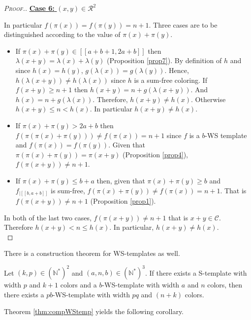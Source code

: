 \begin{proof}[\textsc{Proof.}]
\noindent \underline{\textbf{Case 6:} \((x,y) \in \mathcal{R}^2\)}
\par
In particular \(f(\pi(x)) = f(\pi(y))=n + 1\). Three cases are to be distinguished according to the value of \(\pi(x) + \pi(y)\).
\begin{itemize}
\item If \(\pi(x) + \pi(y) \in [\![a + b + 1, 2 a + b]\!]\) then \(\lambda(x + y) = \lambda(x) + \lambda(y)\)
	(Proposition \ref{prop7}). By definition of \(h\) and since \(h(x) = h(y)\), \(g(\lambda(x)) = g(\lambda(y))\).
	Hence, \(h(\lambda(x + y)) \neq h(\lambda(x))\) since \(h\) is a sum-free coloring. If \(f(x+y) \geqslant n + 1\)
	then \(h(x + y) = n + g(\lambda(x + y))\). And \(h(x) = n + g(\lambda(x))\). Therefore, \(h(x + y)  \neq h(x)\).
	Otherwise \(h(x+y) \leqslant n < h(x)\). In particular \(h(x + y) \neq h(x)\).
\item If \(\pi(x)+\pi(y)>2a+b\) then \(f(\pi(\pi(x)+\pi(y))) \neq f(\pi(x)) = n + 1\) since \(f\) is a \(b\)-WS template and
	\(f(\pi(x)) = f(\pi(y))\). Given that \(\pi(\pi(x)+\pi(y)) = \pi(x+y)\) (Proposition \ref{prop4}), \(f(\pi(x+y)) \neq n + 1\).
\item \begin{sloppypar}
	If \(\pi(x)+\pi(y)\leqslant b+a\) then, given that \(\pi(x)+\pi(y) \geqslant b\) and \(f_{| [\![b, a + b ]\!]}\) is
	sum-free, \({f(\pi(x) + \pi(y)) \neq f(\pi(x)) = n + 1}\). That is \({f(\pi(x + y)) \neq n + 1}\) (Proposition \ref{prop1}).
	\end{sloppypar}
\end{itemize}
\par
In both of the last two cases, \({f(\pi(x + y)) \neq n + 1}\) that is \(x+y \in \mathcal{C}\). Therefore \(h(x+y) < n \leqslant h(x)\).
In particular, \(h(x + y) \neq h(x)\). \\
\end{proof}

There is a construction theorem for WS-templates as well.

\begin{theorem}
\label{thm:compWStemp}
Let \((k,p) \in (\mathbb{N}^*)^2\) and \((a, n, b) \in (\mathbb{N}^*)^3\). If there exists a S-template with width
\(p\) and \(k+1\) colors and a \(b\)-WS-template with width \(a\) and \(n\) colors, then there exists a \(pb\)-WS-template
with width \(pq\) and \((n+k)\) colors.
\end{theorem}

Theorem \ref{thm:compWStemp} yields the following corollary.

